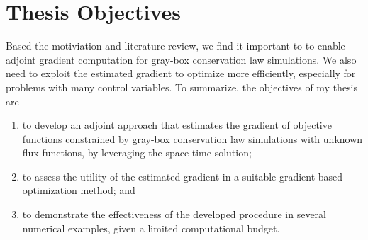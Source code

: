 


\section{Thesis Objectives}
Based the motiviation and literature review, we find it important to to enable adjoint
gradient computation for gray-box conservation law simulations. We also need to 
exploit the estimated gradient to optimize more efficiently, 
especially for problems with many control variables. 
To summarize, the objectives of my thesis are
\begin{enumerate}
    \item to develop an adjoint approach that estimates the gradient of objective functions
          constrained by gray-box conservation law simulations with unknown flux functions,
          by leveraging the space-time solution;
    \item to assess the utility of the estimated gradient in a suitable 
          gradient-based optimization method; and
    \item to demonstrate the effectiveness of the developed procedure in several numerical examples,
          given a limited computational budget.
\end{enumerate}


